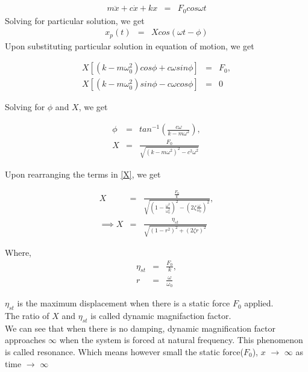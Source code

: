 \documentclass[11pt]{article}
\begin{document}
\begin{eqnarray}
m\ddot{x} + c\dot{x} + kx &=& F_0cos\omega t
\end{eqnarray}
\noindent Solving for particular solution, we get
\begin{eqnarray}
x_p(t) &=& Xcos(\omega t - \phi)
\end{eqnarray}
\noindent Upon substituting particular solution in equation of motion, we get

\begin{eqnarray}
X[(k - m\omega_0^2)cos\phi + c\omega sin\phi] &=& F_0, \\ 
X[(k - m\omega_0^2)sin\phi - c\omega cos\phi] &=& 0 
\end{eqnarray}

\noindent Solving for $\phi$ and $X$, we get

\begin{eqnarray}
\phi &=& tan^{-1} \left( \frac{c\omega}{k - m\omega^2} \right), \\
\label{X}
X &=& \frac{F_0}{\sqrt{\left( k - m\omega^2\right)^2 - c^2\omega^2}}
\end{eqnarray}

\noindent Upon rearranging the terms in \ref{X}, we get 

\begin{eqnarray}
X &=& \frac{ \frac{F_0}{k} }{ \sqrt{ \left( 1 - \frac{\omega^2}{\omega_0^2} \right)^2 - \left( 2\zeta \frac{\omega}{\omega_0} \right)^2 } }, \\
\implies X &=& \frac{ \eta_{st} }{ \sqrt{ \left( 1 - r^2 \right)^2 + \left( 2\zeta r \right)^2 } } 
\end{eqnarray}

\noindent Where,
\begin{eqnarray}
\eta_{st} &=& \frac{F_0}{k}, \\
r &=& \frac{\omega}{\omega_0}
\end{eqnarray}

\noindent$\eta_{st}$ is the maximum displacement when there is a static force $F_0$ applied. \\
The ratio  of $X$ and $\eta_{st}$ is called dynamic magnifaction factor. \\
We can see that when there is no damping, dynamic magnification factor approaches $\infty$ 
when the system is forced at natural frequency. This phenomenon is called resonance. Which means 
however small the static force($F_0$), $x$ $\rightarrow$ $\infty$ as time $\rightarrow$ $\infty$
 
{}

 
\end{document}
